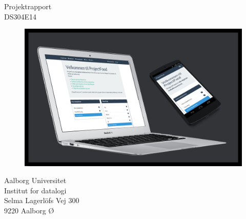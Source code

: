   \begin{center}
    {\large
      Projektrapport%
    }\\
    \vspace{0.2cm}
    {\Large
      DS304E14%
    }
  \begin{figure}[h]
  \includegraphics[scale=1]{images/Images/projectfrontpage.png}		
  \end{figure}


  \end{center}
  \vfill
  \begin{center}
  Aalborg Universitet\\
  Institut for datalogi\\
  Selma Lagerlöfs Vej 300\\
  9220 Aalborg Ø
  \end{center}
\cleardoublepage
\newpage
